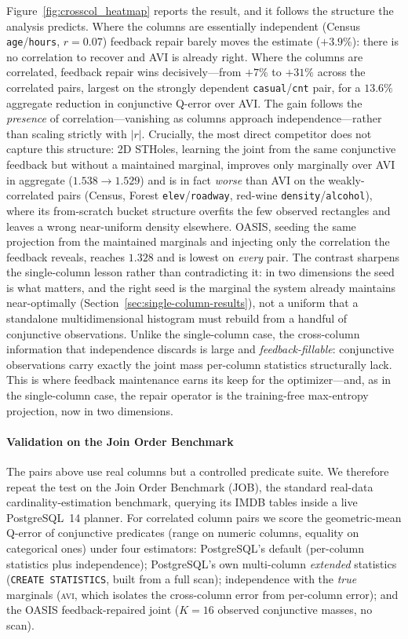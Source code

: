 \documentclass[preprint,12pt]{elsarticle}
\begin{document}
Figure~\ref{fig:crosscol_heatmap} reports the result, and it follows the structure the
analysis predicts. Where the columns are essentially independent (Census \texttt{age}/\texttt{hours},
$r{=}0.07$) feedback repair barely moves the estimate ($+3.9\%$): there is no correlation to
recover and AVI is already right. Where the columns are correlated, feedback repair wins
decisively---from $+7\%$ to $+31\%$ across the correlated pairs, largest on the strongly
dependent \texttt{casual}/\texttt{cnt} pair, for a $13.6\%$ aggregate reduction in conjunctive
Q-error over AVI. The gain follows the \emph{presence} of correlation---vanishing as columns
approach independence---rather than scaling strictly with $|r|$. Crucially, the most direct
competitor does not capture this structure: 2D STHoles, learning the joint from the same
conjunctive feedback but without a maintained marginal, improves only marginally over AVI in
aggregate ($1.538\!\to\!1.529$) and is in fact \emph{worse} than AVI on the weakly-correlated
pairs (Census, Forest \texttt{elev}/\texttt{roadway}, red-wine \texttt{density}/\texttt{alcohol}),
where its from-scratch bucket structure overfits the few observed rectangles and leaves a wrong
near-uniform density elsewhere. OASIS, seeding the same projection from the maintained marginals
and injecting only the correlation the feedback reveals, reaches $1.328$ and is lowest on
\emph{every} pair. The contrast sharpens the single-column lesson rather than contradicting it:
in two dimensions the seed is what matters, and the right seed is the marginal the system already
maintains near-optimally (Section~\ref{sec:single-column-results}), not a uniform that a
standalone multidimensional histogram must rebuild from a handful of conjunctive observations.
Unlike the single-column
case, the cross-column information that independence discards is large and
\emph{feedback-fillable}: conjunctive observations carry exactly the joint mass per-column
statistics structurally lack. This is where feedback maintenance earns its keep for the
optimizer---and, as in the single-column case, the repair operator is the training-free
max-entropy projection, now in two dimensions.

\paragraph{Validation on the Join Order Benchmark}
The pairs above use real columns but a controlled predicate suite. We therefore repeat the
test on the Join Order Benchmark (JOB), the standard real-data cardinality-estimation
benchmark, querying its IMDB tables inside a live PostgreSQL~14 planner. For correlated
column pairs we score the geometric-mean Q-error of conjunctive predicates (range on numeric
columns, equality on categorical ones) under four estimators: PostgreSQL's default
(per-column statistics plus independence); PostgreSQL's own multi-column \emph{extended}
statistics (\texttt{CREATE STATISTICS}, built from a full scan); independence with the
\emph{true} marginals (\textsc{avi}, which isolates the cross-column error from per-column
error); and the OASIS feedback-repaired joint ($K{=}16$ observed conjunctive masses, no scan).
\end{document}
